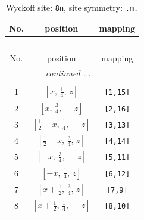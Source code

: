 \documentclass[fleqn,8pt]{jsarticle}
\begin{document}
\begin{longtable}{ccc}
\caption{Wyckoff site: {\tt 8n}, site symmetry: {\tt .m.}}
 \\
 \hline \hline
No. & position & mapping \\ \hline \endfirsthead

\multicolumn{2}{l}{\tablename\ \thetable{}} \\
 \hline \hline
No. & position & mapping \\ \hline \endhead

 \hline \hline
\multicolumn{2}{r}{\footnotesize\it continued ...} \\ \endfoot

 \hline \hline
\multicolumn{2}{r}{} \\ \endlastfoot

1 & $\left[ x,\, \frac{1}{4},\, z \right]$ & {\tt [1,15]} \\ \hline
2 & $\left[ x,\, \frac{3}{4},\, - z \right]$ & {\tt [2,16]} \\ \hline
3 & $\left[ \frac{1}{2} - x,\, \frac{1}{4},\, - z \right]$ & {\tt [3,13]} \\ \hline
4 & $\left[ \frac{1}{2} - x,\, \frac{3}{4},\, z \right]$ & {\tt [4,14]} \\ \hline
5 & $\left[ - x,\, \frac{3}{4},\, - z \right]$ & {\tt [5,11]} \\ \hline
6 & $\left[ - x,\, \frac{1}{4},\, z \right]$ & {\tt [6,12]} \\ \hline
7 & $\left[ x + \frac{1}{2},\, \frac{3}{4},\, z \right]$ & {\tt [7,9]} \\ \hline
8 & $\left[ x + \frac{1}{2},\, \frac{1}{4},\, - z \right]$ & {\tt [8,10]} \\
\end{longtable}
\renewcommand{\arraystretch}{1.2}
\end{document}
